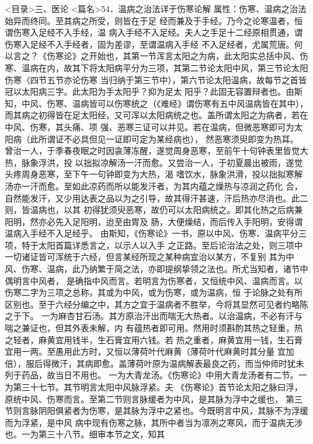 \documentclass[a4paper,12pt,UTF8,twoside]{ctexbook}
\begin{document}
<目录>三、医论
<篇名>54．温病之治法详于伤寒论解
属性：伤寒、温病之治法始异而终同。至其病之所受，则皆在于足 
经而兼及于手经。乃今之论寒温者，恒谓伤寒入足经不入手经，温 
病入手经不入足经。夫人之手足十二经原相贯通，谓伤寒入足经不入手经者，固为差谬，至谓温病入手经 
不入足经者，尤属荒唐。何以言之？《伤寒论》之开始也，其第一节浑言太阳之为病，此太阳实总括中风、伤 
寒、温病在内，故其下将太阳病平分为三项，其第二节论太阳中风，第三节论太阳伤寒（四节五节亦论伤寒 
当归纳于第三节中），第六节论太阳温病，故每节之首皆冠以太阳病三字。此太阳为手太阳乎？抑为足太 
阳乎？此固无容置辩者也。由斯知，中风、伤寒、温病皆可以伤寒统之（《难经》谓伤寒有五中风温病皆在其中）， 
而其病之初得皆在足太阳经，又可浑以太阳病统之也。盖所谓太阳之为病者，若在中风、伤寒，其头痛、项 
强、恶寒三证可以并见。若在温病，但微恶寒即可为太阳病（此所谓证不必具但见一证即可定为某经病也）， 
然恶寒须臾即变为热耳。 
曾治一人，于季春夜眠之时因衾薄冻醒，遂觉周身恶寒，至前午十句钟表里皆觉大热，脉象浮洪，投 
以拙拟凉解汤一汗而愈。又尝治一人，于初夏晨出被雨，遂觉头疼周身恶寒，至下午一句钟即变为大热，渴 
嗜饮水，脉象洪滑，投以拙拟寒解汤亦一汗而愈。至如此凉药而所以能发汗者，为其内蕴之燥热与凉润之药化 
合，自然能发汗，又少用达表之品以为之引导，故其得汗甚速，汗后热亦尽消也。此二则，皆温病也，以其 
初得犹须臾恶寒，故仍可以太阳病统之。即其化热之后病兼阳明，然亦必先入足阳明，迨至由胃及 
肠，大便燥结，而后传入手阳明，安得谓温病入手经不入足经乎。 
由斯知，《伤寒论》一书，原以中风、伤寒、温病平分三项，特于太阳首篇详悉言之，以示人以入手 
之正路。至后论治法之处，则三项中一切诸证皆可浑统于六经，但言某经所现之某种病宜治以某方，不复别 
其为中风、伤寒、温病，此乃纳繁于简之法，亦即提纲挚领之法也。所尤当知者，诸节中偶明言中风者， 
是确指中风而言。若明言为伤寒者，又恒统中风、温病而言。以 
伤寒二字为三项之总称，其或为中风，或为伤寒，或为温病，恒 
于论脉之处有所区别也。至于六经分编之中，其方之宜于温病者不胜举，今将其显然可见者约略陈之于下。 
一为麻杏甘石汤。其方原治汗出而喘无大热者。以治温病，不必有汗与喘之兼证也，但其外表未解，内 
有蕴热者即可用。然用时须斟酌其热之轻重，热之轻者，麻黄宜用钱半，生石膏宜用六钱。若 
热之重者，麻黄宜用一钱，生石膏宜用一两。至愚用此方时，又恒以薄荷叶代麻黄（薄荷叶代麻黄时其分量 
宜加倍），服后得微汗，其病即愈。盖薄荷叶原为温病解表最良之药，而当仲师时犹未列于药品，故当日不用也。 
一为大青龙汤。《伤寒论》中用大青龙汤者有二节。一为第三十七节。其节明言太阳中风脉浮紧。夫 
《伤寒论》首节论太阳之脉曰浮，原统中风、伤寒而言。至第二节则言脉缓者为中风，是其脉为浮中之缓也， 
第三节则言脉阴阳俱紧者为伤寒，是其脉为浮中之紧也。今既明言中风，其脉不为浮缓而为浮紧，是中风 
病中现有伤寒之脉，其所中者当为凛冽之寒风，而于温病无涉也。一为第三十八节。细审本节之文，知其 
\end{document}
